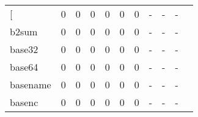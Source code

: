 \begin{longtable}{lp{1.2cm}p{1.2cm}p{1.2cm}p{1.2cm}p{1.2cm}p{1.2cm}p{1.2cm}p{1.2cm}p{1.2cm}p{1.2cm}}
\bottomrule
\endlastfoot
{[}         &                                     0 &                                                  0 &                                                  0 &                                                  0 &                                                  0 &                                                  0 &                                             - &                                                  - &                                                  - \\
b2sum     &                                     0 &                                                  0 &                                                  0 &                                                  0 &                                                  0 &                                                  0 &                                             - &                                                  - &                                                  - \\
base32    &                                     0 &                                                  0 &                                                  0 &                                                  0 &                                                  0 &                                                  0 &                                             - &                                                  - &                                                  - \\
base64    &                                     0 &                                                  0 &                                                  0 &                                                  0 &                                                  0 &                                                  0 &                                             - &                                                  - &                                                  - \\
basename  &                                     0 &                                                  0 &                                                  0 &                                                  0 &                                                  0 &                                                  0 &                                             - &                                                  - &                                                  - \\
basenc    &                                     0 &                                                  0 &                                                  0 &                                                  0 &                                                  0 &                                                  0 &                                             - &                                                  - &                                                  - \\

\end{longtable}
